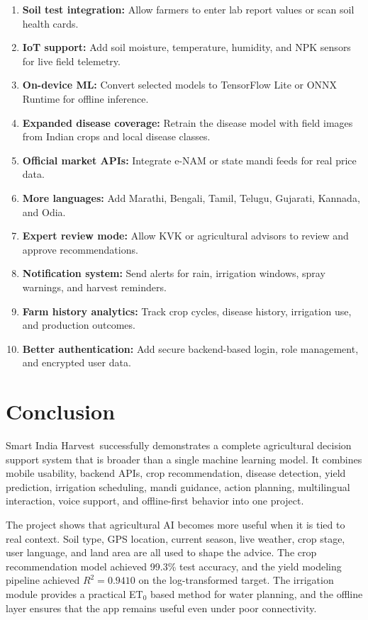 \documentclass[12pt,a4paper]{report}
\newcommand{\ProjectName}{Smart India Harvest}
\begin{document}
\begin{enumerate}[leftmargin=1.5em]
  \item \textbf{Soil test integration:} Allow farmers to enter lab report values or scan soil health cards.
  \item \textbf{IoT support:} Add soil moisture, temperature, humidity, and NPK sensors for live field telemetry.
  \item \textbf{On-device ML:} Convert selected models to TensorFlow Lite or ONNX Runtime for offline inference.
  \item \textbf{Expanded disease coverage:} Retrain the disease model with field images from Indian crops and local disease classes.
  \item \textbf{Official market APIs:} Integrate e-NAM or state mandi feeds for real price data.
  \item \textbf{More languages:} Add Marathi, Bengali, Tamil, Telugu, Gujarati, Kannada, and Odia.
  \item \textbf{Expert review mode:} Allow KVK or agricultural advisors to review and approve recommendations.
  \item \textbf{Notification system:} Send alerts for rain, irrigation windows, spray warnings, and harvest reminders.
  \item \textbf{Farm history analytics:} Track crop cycles, disease history, irrigation use, and production outcomes.
  \item \textbf{Better authentication:} Add secure backend-based login, role management, and encrypted user data.
\end{enumerate}

\singlespacing

\chapter{Conclusion}
\doublespacing

\ProjectName\ successfully demonstrates a complete agricultural decision support system that is broader than a single machine learning model. It combines mobile usability, backend APIs, crop recommendation, disease detection, yield prediction, irrigation scheduling, mandi guidance, action planning, multilingual interaction, voice support, and offline-first behavior into one project.

The project shows that agricultural AI becomes more useful when it is tied to real context. Soil type, GPS location, current season, live weather, crop stage, user language, and land area are all used to shape the advice. The crop recommendation model achieved 99.3\% test accuracy, and the yield modeling pipeline achieved $R^2 = 0.9410$ on the log-transformed target. The irrigation module provides a practical ET$_0$ based method for water planning, and the offline layer ensures that the app remains useful even under poor connectivity.
\end{document}
